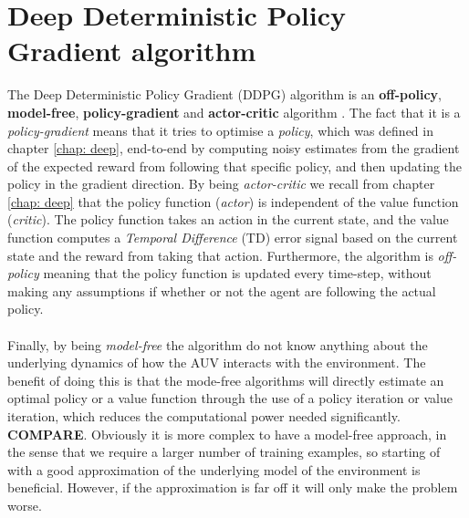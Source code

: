 \section{Deep Deterministic Policy Gradient algorithm}
The Deep Deterministic Policy Gradient (DDPG) algorithm is an \textbf{off-policy}, \textbf{model-free}, \textbf{policy-gradient} and \textbf{actor-critic} algorithm \cite{Emami}. The fact that it is a \textit{policy-gradient} means that it tries to optimise a \textit{policy}, which was defined in chapter \ref{chap: deep}, end-to-end by computing noisy estimates from the gradient of the expected reward from following that specific policy, and then updating the policy in the gradient direction. By being \textit{actor-critic} we recall from chapter \ref{chap: deep} that the policy function (\textit{actor}) is independent of the value function (\textit{critic}). The policy function takes an action in the current state, and the value function computes a \textit{Temporal Difference} (TD) error signal based on the current state and the reward from taking that action. Furthermore, the algorithm is \textit{off-policy} meaning that the policy function is updated every time-step, without making any assumptions if whether or not the agent are following the actual policy.\\\\Finally, by being \textit{model-free} the algorithm do not know anything about the underlying dynamics of how the AUV interacts with the environment. The benefit of doing this is that the mode-free algorithms will directly estimate an optimal policy or a value function through the use of a policy iteration or value iteration, which reduces the computational power needed significantly. \textbf{COMPARE}. Obviously it is more complex to have a model-free approach, in the sense that we require a larger number of training examples, so starting of with a good approximation of the underlying model of the environment is beneficial. However, if the approximation is far off it will only make the problem worse.
